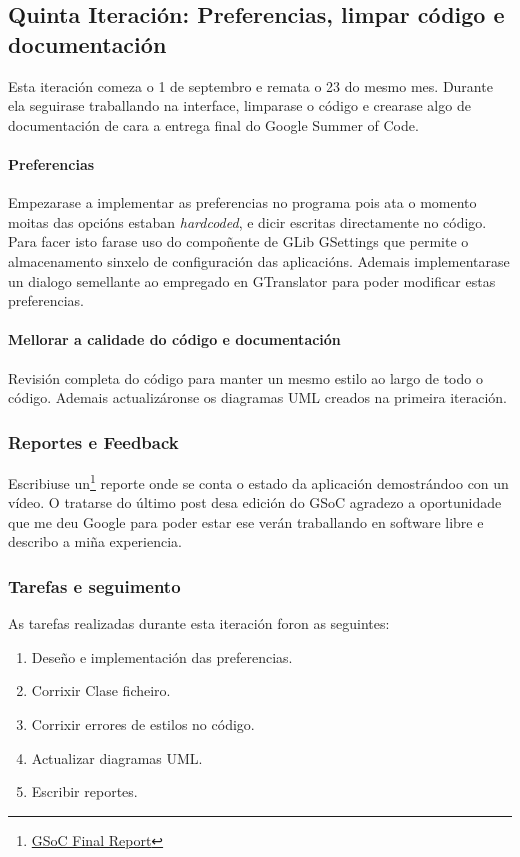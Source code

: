 \subsection{Quinta Iteración: Preferencias, limpar código e documentación}
Esta iteración comeza o 1 de septembro e remata o 23 do mesmo mes. Durante ela seguirase traballando na interface, limparase o código e crearase algo de documentación de cara a entrega final do Google Summer of Code.

\paragraph{Preferencias}
Empezarase a implementar as preferencias no programa pois ata o momento moitas das opcións estaban \emph{hardcoded}, e dicir escritas directamente no código. Para facer isto farase uso do compoñente de GLib GSettings que permite o almacenamento sinxelo de configuración das aplicacións. Ademais implementarase un dialogo semellante ao empregado en GTranslator para poder modificar estas preferencias.

\paragraph{Mellorar a calidade do código e documentación}
Revisión completa do código para manter un mesmo estilo ao largo de todo o código. Ademais actualizáronse os diagramas UML creados na primeira iteración.

\subsubsection{Reportes e Feedback}
Escribiuse un\footnote{\href{http://aquelando.info/gsoc-final-report/}{GSoC Final Report}} reporte onde se conta o estado da aplicación demostrándoo con un vídeo. O tratarse do último post desa edición do GSoC agradezo a oportunidade que me deu Google para poder estar ese verán traballando en software libre e describo a miña experiencia.

\subsubsection{Tarefas e seguimento}

As tarefas realizadas durante esta iteración foron as seguintes:

\begin{enumerate}[label=\bfseries WBS 5.\arabic*]
  \item Deseño e implementación das preferencias.
  \item Corrixir Clase ficheiro.
  \item Corrixir errores de estilos no código.
  \item Actualizar diagramas UML.
  \item Escribir reportes.
\end {enumerate}

